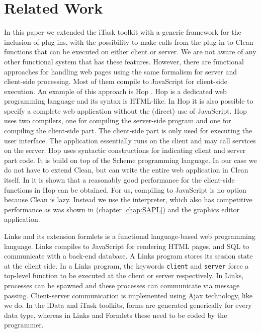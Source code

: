 \section{Related Work}
In this paper we extended the \textsf{iTask} toolkit with a generic framework for the inclusion of plug-ins, with the possibility to make calls from the plug-in to  \textsf{Clean} functions that can be executed on either client or server. 
We are not aware of any other functional system that has these features. 
However, there are functional approaches for handling web pages using the same formalism for server and client-side processing. Most of them compile to \textsf{JavaScript} for  client-side execution. 
An example of this approach is \textsf{Hop} \cite{serm06:WebProgrammingWithHop,loif07:HopClientSideCompilation}. \textsf{Hop} is a dedicated web programming language and its syntax is \textsf{HTML}-like. In \textsf{Hop} it is also possible to specify a complete web application without the (direct) use of \textsf{JavaScript}. \textsf{Hop} uses two compilers, one for compiling the server-side program and one for compiling the client-side part. The client-side part is only used for executing the user interface. The application essentially runs on the client and may call services on the server. \textsf{Hop} uses syntactic constructions for indicating client and server part code. It is build on top of the Scheme programming language. In our case we do not have to extend \textsf{Clean}, but can write the entire web application in \textsf{Clean} itself. 
In \cite{loif07:HopClientSideCompilation} it is shown that a reasonably good performance for the client-side functions in \textsf{Hop} can be obtained. For us, compiling to \textsf{JavaScript} is no option because \textsf{Clean} is lazy. Instead we use the \Sapl interpreter, which also has competitive performance as was shown in \cite{janj06:EfficientInterpretationDataTypesPatternsToFunctions_TFP06_SelectedPapers}  (chapter \ref{chap:SAPL}) and the graphics editor application.

\textsf{Links} \cite{cooe06:WebProgrammingWithLinks} and its extension \textsf{formlets}  is a functional language-based web programming language. \textsf{Links} compiles to \textsf{JavaScript} for rendering \textsf{HTML} pages, and SQL to communicate with a back-end database. A \textsf{Links} program stores its session state at the client side. In a Links program, the keywords \texttt{client} and \texttt{server} force a top-level function to be executed at the client or server respectively. In \textsf{Links}, processes can be spawned and these processes can communicate via message passing. Client-server communication is implemented using \textsf{Ajax} technology, like we do. 
In the \textsf{iData} and \textsf{iTask} toolkits, forms are generated generically for every data type, whereas in \textsf{Links} and \textsf{Formlets} these need to be coded by the programmer. 

